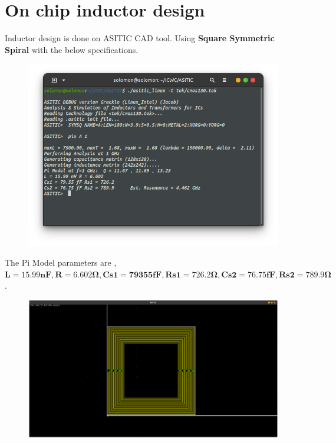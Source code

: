 \documentclass{article}
\begin{document}
\section*{\hfil On chip inductor design}
Inductor design is done on ASITIC CAD tool. Using \textbf{Square Symmetric Spiral} with the below specifications.\\
\begin{figure}[H]
	\centering
	\includegraphics[scale=0.5]{./figs/pix.png}
\end{figure}
The Pi Model parameters are ,\\
$\mathbf{L=15.99nF, R=6.602\si{\ohm}, Cs1=79355fF, Rs1=726.2\si{\ohm}, Cs2=76.75fF, Rs2=789.9\si{\ohm}}$.
\begin{figure}[H]
	\centering
	\includegraphics[scale=0.3]{./figs/ind.png}
\end{figure}
\end{document}
